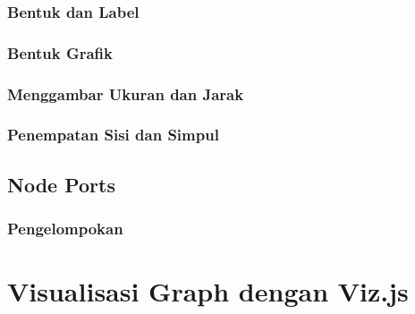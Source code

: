 \subsubsection{Bentuk dan Label}
\label{sec: Bentuk dan Label}

\subsubsection{Bentuk Grafik}
\label{sec: Bentuk Grafik}

\subsubsection{Menggambar Ukuran dan Jarak}
\label{sec: Menggambar Ukuran dan Jarak}

\subsubsection{Penempatan Sisi dan Simpul}
\label{sec: Penempatan Sisi dan Simpul}

\subsection{Node Ports}
\label{sec: Node Ports}

\subsubsection{Pengelompokan}
\label{sec: Pengelompokan}


\section{Visualisasi Graph dengan Viz.js}
\label{sec: Visualisasi Graph dengan Viz.js}

